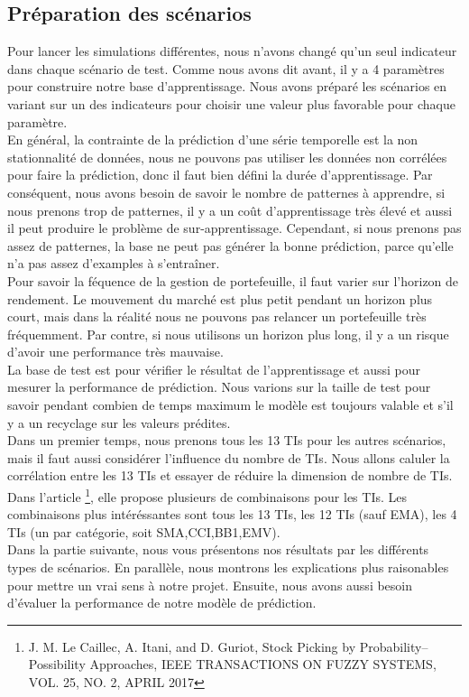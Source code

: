 \subsection{Préparation des scénarios}

Pour lancer les simulations différentes, nous n'avons changé qu'un seul indicateur dans chaque scénario de test. Comme nous avons dit avant, il y a 4 paramètres pour construire notre base d'apprentissage. Nous avons préparé les scénarios en variant sur un des indicateurs pour choisir une valeur plus favorable pour chaque paramètre. \\

En général, la contrainte de la prédiction d'une série temporelle est la non stationnalité de données, nous ne pouvons pas utiliser les données non corrélées pour faire la prédiction, donc il faut bien défini la durée d'apprentissage. Par conséquent, nous avons besoin de savoir le nombre de patternes à apprendre, si nous prenons trop de patternes, il y a un coût d'apprentissage très élevé et aussi il peut produire le problème de sur-apprentissage. Cependant, si nous prenons pas assez de patternes, la base ne peut pas générer la bonne prédiction, parce qu'elle n'a pas assez d'examples à s'entraîner. \\

Pour savoir la féquence de la gestion de portefeuille, il faut varier sur l'horizon de rendement. Le mouvement du marché est plus petit pendant un horizon plus court, mais dans la réalité nous ne pouvons pas relancer un portefeuille très fréquemment. Par contre, si nous utilisons un horizon plus long, il y a un risque d'avoir une performance très mauvaise. \\

La base de test est pour vérifier le résultat de l'apprentissage et aussi pour mesurer la performance de prédiction. Nous varions sur la taille de test pour savoir pendant combien de temps maximum le modèle est toujours valable et s'il y a un recyclage sur les valeurs prédites. \\

Dans un premier temps, nous prenons tous les 13 TIs pour les autres scénarios, mais il faut aussi considérer l'influence du nombre de TIs. Nous allons caluler la corrélation entre les 13 TIs et essayer de réduire la dimension de nombre de TIs. Dans l'article \footnote{J. M. Le Caillec, A. Itani, and D. Guriot, Stock Picking by Probability–Possibility Approaches, IEEE TRANSACTIONS ON FUZZY SYSTEMS, VOL. 25, NO. 2, APRIL 2017}, elle propose plusieurs de combinaisons pour les TIs. Les combinaisons plus intéréssantes sont tous les 13 TIs, les 12 TIs (sauf EMA), les 4 TIs (un par catégorie, soit SMA,CCI,BB1,EMV).\\

Dans la partie suivante, nous vous présentons nos résultats par les différents types de scénarios. En parallèle, nous montrons les explications plus raisonables pour mettre un vrai sens à notre projet. Ensuite, nous avons aussi besoin d'évaluer la performance de notre modèle de prédiction.




  





